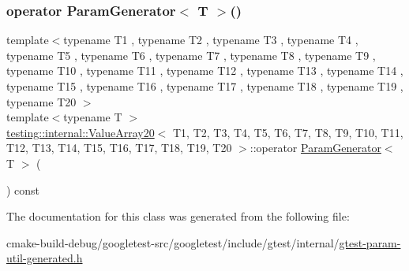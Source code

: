 \subsubsection{\texorpdfstring{operator ParamGenerator$<$ T $>$()}{operator ParamGenerator< T >()}}
{\footnotesize\ttfamily template$<$typename T1 , typename T2 , typename T3 , typename T4 , typename T5 , typename T6 , typename T7 , typename T8 , typename T9 , typename T10 , typename T11 , typename T12 , typename T13 , typename T14 , typename T15 , typename T16 , typename T17 , typename T18 , typename T19 , typename T20 $>$ \\
template$<$typename T $>$ \\
\mbox{\hyperlink{classtesting_1_1internal_1_1ValueArray20}{testing\+::internal\+::\+Value\+Array20}}$<$ T1, T2, T3, T4, T5, T6, T7, T8, T9, T10, T11, T12, T13, T14, T15, T16, T17, T18, T19, T20 $>$\+::operator \mbox{\hyperlink{classtesting_1_1internal_1_1ParamGenerator}{Param\+Generator}}$<$ T $>$ (\begin{DoxyParamCaption}{ }\end{DoxyParamCaption}) const\hspace{0.3cm}{\ttfamily [inline]}}



The documentation for this class was generated from the following file\+:\begin{DoxyCompactItemize}
\item 
cmake-\/build-\/debug/googletest-\/src/googletest/include/gtest/internal/\mbox{\hyperlink{gtest-param-util-generated_8h}{gtest-\/param-\/util-\/generated.\+h}}\end{DoxyCompactItemize}
